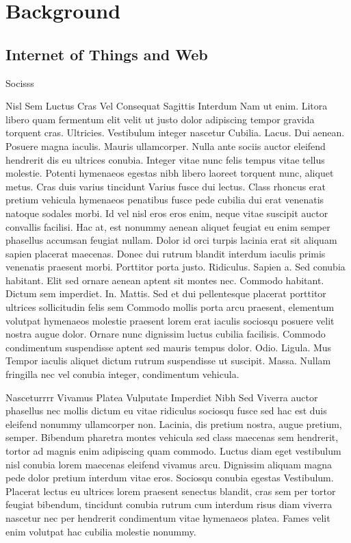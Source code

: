 \chead{}
\chapter{Background}

\section{Internet of Things and Web}

Socisss

Nisl Sem Luctus Cras Vel Consequat Sagittis Interdum
Nam ut enim. Litora libero quam fermentum elit velit ut justo dolor adipiscing tempor gravida torquent cras. Ultricies. Vestibulum integer nascetur Cubilia. Lacus. Dui aenean. Posuere magna iaculis. Mauris ullamcorper. Nulla ante sociis auctor eleifend hendrerit dis eu ultrices conubia. Integer vitae nunc felis tempus vitae tellus molestie. Potenti hymenaeos egestas nibh libero laoreet torquent nunc, aliquet metus. Cras duis varius tincidunt Varius fusce dui lectus. Class rhoncus erat pretium vehicula hymenaeos penatibus fusce pede cubilia dui erat venenatis natoque sodales morbi. Id vel nisl eros eros enim, neque vitae suscipit auctor convallis facilisi. Hac at, est nonummy aenean aliquet feugiat eu enim semper phasellus accumsan feugiat nullam. Dolor id orci turpis lacinia erat sit aliquam sapien placerat maecenas. Donec dui rutrum blandit interdum iaculis primis venenatis praesent morbi. Porttitor porta justo. Ridiculus. Sapien a. Sed conubia habitant. Elit sed ornare aenean aptent sit montes nec. Commodo habitant. Dictum sem imperdiet. In. Mattis. Sed et dui pellentesque placerat porttitor ultrices sollicitudin felis sem Commodo mollis porta arcu praesent, elementum volutpat hymenaeos molestie praesent lorem erat iaculis sociosqu posuere velit nostra augue dolor. Ornare nunc dignissim luctus cubilia facilisis. Commodo condimentum suspendisse aptent sed mauris tempus dolor. Odio. Ligula. Mus Tempor iaculis aliquet dictum rutrum suspendisse ut suscipit. Massa. Nullam fringilla nec vel conubia integer, condimentum vehicula.

Nasceturrrr Vivamus Platea Vulputate Imperdiet Nibh Sed
Viverra auctor phasellus nec mollis dictum eu vitae ridiculus sociosqu fusce sed hac est duis eleifend nonummy ullamcorper non. Lacinia, dis pretium nostra, augue pretium, semper. Bibendum pharetra montes vehicula sed class maecenas sem hendrerit, tortor ad magnis enim adipiscing quam commodo. Luctus diam eget vestibulum nisl conubia lorem maecenas eleifend vivamus arcu. Dignissim aliquam magna pede dolor pretium interdum vitae eros. Sociosqu conubia egestas Vestibulum. Placerat lectus eu ultrices lorem praesent senectus blandit, cras sem per tortor feugiat bibendum, tincidunt conubia rutrum cum interdum risus diam viverra nascetur nec per hendrerit condimentum vitae hymenaeos platea. Fames velit enim volutpat hac cubilia molestie nonummy.

